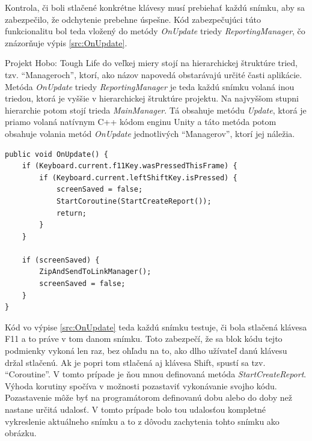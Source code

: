 \documentclass[slovak, bachelorpractice]{diploma}
\begin{document}
Kontrola, či boli stlačené konkrétne klávesy musí prebiehať každú snímku, aby sa zabezpečilo, že odchytenie prebehne úspešne. Kód zabezpečujúci túto funkcionalitu bol teda vložený do metódy \textit{OnUpdate} triedy \textit{ReportingManager}, čo znázorňuje výpis \ref{src:OnUpdate}. 

Projekt Hobo: Tough Life do veľkej miery stojí na hierarchickej štruktúre tried, tzv. \enquote{Manageroch}, ktorí, ako názov napovedá obstarávajú určité časti aplikácie. Metóda \textit{OnUpdate} triedy \textit{ReportingManager} je teda každú snímku volaná inou triedou, ktorá je vyššie v hierarchickej štruktúre projektu. Na najvyššom stupni hierarchie potom stojí trieda \textit{MainManager}. Tá obsahuje metódu \textit{Update}, ktorá je priamo volaná natívnym C++ kódom enginu Unity a táto metóda potom obsahuje volania metód \textit{OnUpdate} jednotlivých \enquote{Managerov}, ktorí jej náležia.
\vspace{10pt}
\begin{lstlisting}[label=src:OnUpdate,caption={Odchytenie stlačenia klávesovej skratky v spustenej hre}]
public void OnUpdate() {
    if (Keyboard.current.f11Key.wasPressedThisFrame) {
        if (Keyboard.current.leftShiftKey.isPressed) {
            screenSaved = false;
            StartCoroutine(StartCreateReport());
            return;
        }
    }

    if (screenSaved) {
        ZipAndSendToLinkManager();
        screenSaved = false;
    }
}
\end{lstlisting}

Kód vo výpise \ref{src:OnUpdate} teda každú snímku testuje, či bola stlačená klávesa F11 a to práve v tom danom snímku. Toto zabezpečí, že sa blok kódu tejto podmienky vykoná len raz, bez ohľadu na to, ako dlho užívateľ danú klávesu držal stlačenú. Ak je popri tom stlačená aj klávesa Shift, spustí sa tzv. \enquote{Coroutine}. V tomto prípade je ňou mnou definovaná metóda \textit{StartCreateReport}. Výhoda korutiny spočíva v možnosti pozastaviť vykonávanie svojho kódu. Pozastavenie môže byť na programátorom definovanú dobu alebo do doby než nastane určitá udalosť. V tomto prípade bolo tou udalosťou kompletné vykreslenie aktuálneho snímku a to z dôvodu zachytenia tohto snímku ako obrázku.
\end{document}
